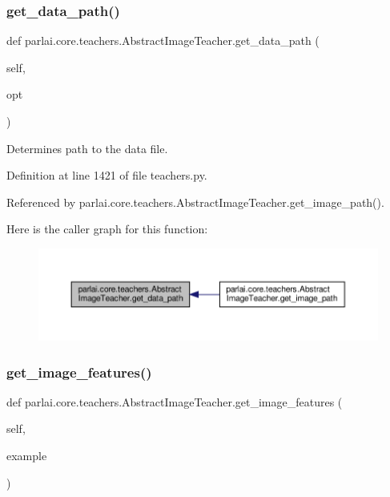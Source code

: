 \subsubsection{\texorpdfstring{get\+\_\+data\+\_\+path()}{get\_data\_path()}}
{\footnotesize\ttfamily def parlai.\+core.\+teachers.\+Abstract\+Image\+Teacher.\+get\+\_\+data\+\_\+path (\begin{DoxyParamCaption}\item[{}]{self,  }\item[{}]{opt }\end{DoxyParamCaption})}

\begin{DoxyVerb}Determines path to the data file.\end{DoxyVerb}
 

Definition at line 1421 of file teachers.\+py.



Referenced by parlai.\+core.\+teachers.\+Abstract\+Image\+Teacher.\+get\+\_\+image\+\_\+path().

Here is the caller graph for this function\+:
\nopagebreak
\begin{figure}[H]
\begin{center}
\leavevmode
\includegraphics[width=350pt]{classparlai_1_1core_1_1teachers_1_1AbstractImageTeacher_aa3c1da773025838ffa03b47c3fc21c7e_icgraph}
\end{center}
\end{figure}
\mbox{\label{classparlai_1_1core_1_1teachers_1_1AbstractImageTeacher_a3e1f85a8de230d8733272bd1e860cd92}} 
\subsubsection{\texorpdfstring{get\+\_\+image\+\_\+features()}{get\_image\_features()}}
{\footnotesize\ttfamily def parlai.\+core.\+teachers.\+Abstract\+Image\+Teacher.\+get\+\_\+image\+\_\+features (\begin{DoxyParamCaption}\item[{}]{self,  }\item[{}]{example }\end{DoxyParamCaption})}

